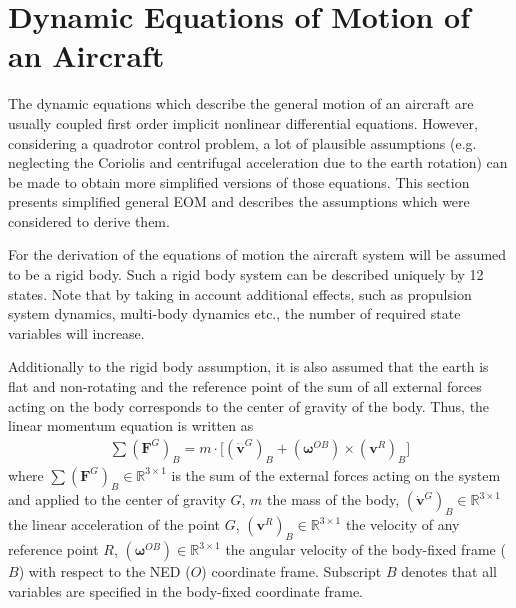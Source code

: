 \documentclass[11pt, a4paper, twoside]{report}
\begin{document}
\thispagestyle{fancy}

\section{Dynamic Equations of Motion of an Aircraft} \label{sec:eqs_motion}

The dynamic equations which describe the general motion of an aircraft are usually coupled first order implicit nonlinear differential equations. However, considering a quadrotor control problem, a lot of plausible assumptions (e.g. neglecting the Coriolis and centrifugal acceleration due to the earth rotation) can be made to obtain more simplified versions of those equations. This section presents simplified general \acrshort{EOM} and describes the assumptions which were considered to derive them.

For the derivation of the equations of motion the aircraft system will be assumed to be a rigid body. Such a rigid body system can be described uniquely by 12 states. Note that by taking in account additional effects, such as propulsion system dynamics, multi-body dynamics etc., the number of required state variables will increase. 

Additionally to the rigid body assumption, it is also assumed that the earth is flat and non-rotating and the reference point of the sum of all external forces acting on the body corresponds to the center of gravity of the body. Thus, the linear momentum equation is written as
\begin{equation}
	\begin{split}
		\sum (\bm{F}^G)_B = m \cdot \Big[ (\bm{\dot{v}}^G)_{B} + (\bm{\omega}^{OB})\times(\bm{v}^R)_{B} \Big]
		\label{eq:lin_momentum}
	\end{split}
\end{equation}
where $\sum(\bm{F}^G)_B \in \mathbb{R}^{3 \times 1}$ is the sum of the external forces acting on the system and applied to the center of gravity $G$, $m$ the mass of the body, $(\bm{\dot{v}}^G)_{B} \in \mathbb{R}^{3 \times 1}$ the linear acceleration of the point $G$, $(\bm{v}^R)_{B} \in \mathbb{R}^{3 \times 1}$ the velocity of any reference point $R$, $(\bm{\omega}^{OB}) \in \mathbb{R}^{3 \times 1}$ the angular velocity of the body-fixed frame ($B$) with respect to the \acrfull{NED} ($O$) coordinate frame. Subscript $B$ denotes that all variables are specified in the body-fixed coordinate frame.
\end{document}
